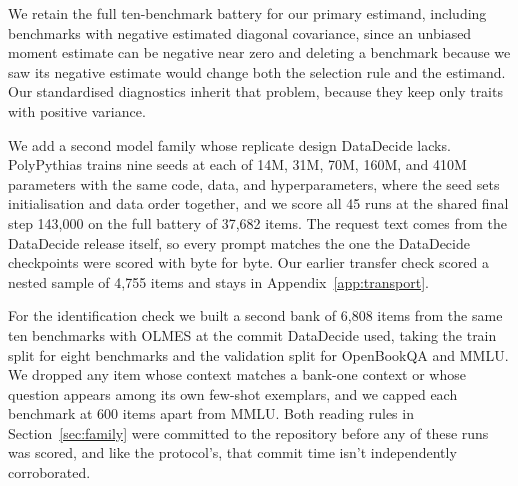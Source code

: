 We retain the full ten-benchmark battery for our primary estimand, including benchmarks with negative estimated diagonal covariance, since an unbiased moment estimate can be negative near zero and deleting a benchmark because we saw its negative estimate would change both the selection rule and the estimand. Our standardised diagnostics inherit that problem, because they keep only traits with positive variance.

We add a second model family whose replicate design DataDecide lacks. PolyPythias \citep{vanderwal2025} trains nine seeds at each of 14M, 31M, 70M, 160M, and 410M parameters with the same code, data, and hyperparameters, where the seed sets initialisation and data order together, and we score all 45 runs at the shared final step 143,000 on the full battery of 37,682 items. The request text comes from the DataDecide release itself, so every prompt matches the one the DataDecide checkpoints were scored with byte for byte. Our earlier transfer check scored a nested sample of 4,755 items and stays in Appendix~\ref{app:transport}.

For the identification check we built a second bank of 6,808 items from the same ten benchmarks with OLMES at the commit DataDecide used, taking the train split for eight benchmarks and the validation split for OpenBookQA and MMLU. We dropped any item whose context matches a bank-one context or whose question appears among its own few-shot exemplars, and we capped each benchmark at 600 items apart from MMLU. Both reading rules in Section~\ref{sec:family} were committed to the repository before any of these runs was scored, and like the protocol's, that commit time isn't independently corroborated.

